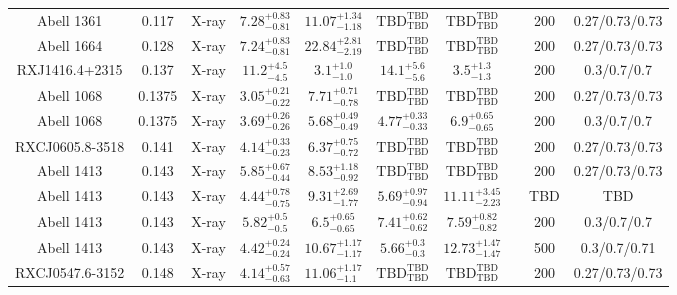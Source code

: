\begin{table}
\begin{tabular}{cccccccccc}
Abell 1361 & 0.117 & X-ray & ${7.28}^{+0.83}_{-0.81}$ & ${11.07}^{+1.34}_{-1.18}$ & ${\mathrm{TBD}}^{\mathrm{TBD}}_{\mathrm{TBD}}$ & ${\mathrm{TBD}}^{\mathrm{TBD}}_{\mathrm{TBD}}$ & \citet{BA14.1} & 200 & 0.27/0.73/0.73 \\
Abell 1664 & 0.128 & X-ray & ${7.24}^{+0.83}_{-0.81}$ & ${22.84}^{+2.81}_{-2.19}$ & ${\mathrm{TBD}}^{\mathrm{TBD}}_{\mathrm{TBD}}$ & ${\mathrm{TBD}}^{\mathrm{TBD}}_{\mathrm{TBD}}$ & \citet{BA14.1} & 200 & 0.27/0.73/0.73 \\
RXJ1416.4+2315 & 0.137 & X-ray & ${11.2}^{+4.5}_{-4.5}$ & ${3.1}^{+1.0}_{-1.0}$ & ${14.1}^{+5.6}_{-5.6}$ & ${3.5}^{+1.3}_{-1.3}$ & \citet{KH06.1} & 200 & 0.3/0.7/0.7 \\
Abell 1068 & 0.1375 & X-ray & ${3.05}^{+0.21}_{-0.22}$ & ${7.71}^{+0.71}_{-0.78}$ & ${\mathrm{TBD}}^{\mathrm{TBD}}_{\mathrm{TBD}}$ & ${\mathrm{TBD}}^{\mathrm{TBD}}_{\mathrm{TBD}}$ & \citet{BA14.1} & 200 & 0.27/0.73/0.73 \\
Abell 1068 & 0.1375 & X-ray & ${3.69}^{+0.26}_{-0.26}$ & ${5.68}^{+0.49}_{-0.49}$ & ${4.77}^{+0.33}_{-0.33}$ & ${6.9}^{+0.65}_{-0.65}$ & \citet{PO05.1} & 200 & 0.3/0.7/0.7 \\
RXCJ0605.8-3518 & 0.141 & X-ray & ${4.14}^{+0.33}_{-0.23}$ & ${6.37}^{+0.75}_{-0.72}$ & ${\mathrm{TBD}}^{\mathrm{TBD}}_{\mathrm{TBD}}$ & ${\mathrm{TBD}}^{\mathrm{TBD}}_{\mathrm{TBD}}$ & \citet{BA14.1} & 200 & 0.27/0.73/0.73 \\
Abell 1413 & 0.143 & X-ray & ${5.85}^{+0.67}_{-0.44}$ & ${8.53}^{+1.18}_{-0.92}$ & ${\mathrm{TBD}}^{\mathrm{TBD}}_{\mathrm{TBD}}$ & ${\mathrm{TBD}}^{\mathrm{TBD}}_{\mathrm{TBD}}$ & \citet{BA14.1} & 200 & 0.27/0.73/0.73 \\
Abell 1413 & 0.143 & X-ray & ${4.44}^{+0.78}_{-0.75}$ & ${9.31}^{+2.69}_{-1.77}$ & ${5.69}^{+0.97}_{-0.94}$ & ${11.11}^{+3.45}_{-2.23}$ & \citet{SC06.1} & TBD & TBD \\
Abell 1413 & 0.143 & X-ray & ${5.82}^{+0.5}_{-0.5}$ & ${6.5}^{+0.65}_{-0.65}$ & ${7.41}^{+0.62}_{-0.62}$ & ${7.59}^{+0.82}_{-0.82}$ & \citet{PO05.1} & 200 & 0.3/0.7/0.7 \\
Abell 1413 & 0.143 & X-ray & ${4.42}^{+0.24}_{-0.24}$ & ${10.67}^{+1.17}_{-1.17}$ & ${5.66}^{+0.3}_{-0.3}$ & ${12.73}^{+1.47}_{-1.47}$ & \citet{VI05.1} & 500 & 0.3/0.7/0.71 \\
RXCJ0547.6-3152 & 0.148 & X-ray & ${4.14}^{+0.57}_{-0.63}$ & ${11.06}^{+1.17}_{-1.1}$ & ${\mathrm{TBD}}^{\mathrm{TBD}}_{\mathrm{TBD}}$ & ${\mathrm{TBD}}^{\mathrm{TBD}}_{\mathrm{TBD}}$ & \citet{BA14.1} & 200 & 0.27/0.73/0.73 \\

\end{tabular}
\end{table}
